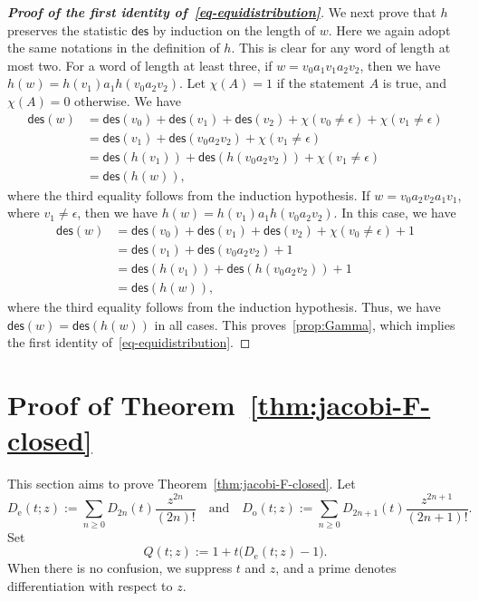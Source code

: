 \documentclass[12pt]{article}
\numberwithin{equation}{section}
\theoremstyle{plain}
\def\des{\mathsf{des}}
\providecommand{\emptyword}{\epsilon}
\begin{document}
\begin{proof}[{\bf Proof of the first identity of~\eqref{eq-equidistribution}}]
   				We next prove that \(h\) preserves the statistic $\des$ by induction on the length
   				of \(w\). Here we again adopt the same notations in the definition of $h$. This is clear for any word of length at most two. For a word of
   				length at least three,  if $w=v_0a_1v_1a_2v_2$, then we have $h(w)=h(v_1)a_1h(v_0a_2v_2)$. 
   				Let $\chi(A)=1$ if the statement $A$ is true, and $\chi(A)=0$ otherwise.
   				We have
				   \[
   				\begin{aligned}
   				\des(w)&=\des(v_0)+\des(v_1)+\des(v_2)+\chi(v_0\neq \emptyword)+\chi(v_1\neq \emptyword)\\
   				&= \des(v_1)+\des(v_0a_2v_2)+\chi(v_1\neq \emptyword)\\
   				&= \des(h(v_1))+\des(h(v_0a_2v_2))+\chi(v_1\neq \emptyword)\\
   				&= \des(h(w)),
   				\end{aligned}
   				\]
   				where  the third equality follows from the induction hypothesis.  
   			If $w=v_0a_2v_2a_1v_1$,  where $v_1\neq \emptyword$, then we have $h(w)=h(v_1)a_1h(v_0a_2v_2)$.  In this case, we have
   				\[
   				\begin{aligned}
   					\des(w)&=\des(v_0)+\des(v_1)+\des(v_2)+\chi(v_0\neq \emptyword)+1\\
   					&= \des(v_1)+\des(v_0a_2v_2)+1\\
   					&= \des(h(v_1))+\des(h(v_0a_2v_2))+1 \\
   					&=\des(h(w)),
   				\end{aligned}
   				\]
   				where  the third equality follows from the induction hypothesis.   Thus, we have $\des(w)=\des(h(w))$ in all cases. This proves~\eqref{prop:Gamma}, which implies the first identity of~\eqref{eq-equidistribution}. 
   			\end{proof}
   			
   			 
   			
   			
  \section{Proof of Theorem~\ref{thm:jacobi-F-closed} }
  \label{Sec:5}	 
   	This section aims to prove Theorem~\ref{thm:jacobi-F-closed}. 		
   				Let 
$$
D_{\mathrm e}(t;z):=\sum\limits_{n\geq0}D_{2n}(t)\frac{z^{2n}}{(2n)!} 
  \quad\text{and}\quad D_{\mathrm o}(t;z):=\sum\limits_{n\geq0}D_{2n+1}(t)\frac{z^{2n+1}}{(2n+1)!}.
$$  Set
   			\[
   			Q(t;z):=1+t\bigl(D_{\mathrm e}(t;z)-1\bigr).
   			\]
   			When there is no  confusion, we suppress $t$ and $z$,  and  a prime  denotes
   			differentiation with respect to $z$.
   			
\end{document}
